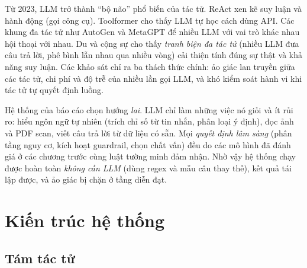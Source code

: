 Từ 2023, LLM trở thành ``bộ não'' phổ biến của tác tử. ReAct \cite{yao2023react} xen kẽ suy luận và hành động (gọi công cụ). Toolformer \cite{schick2023} cho thấy LLM tự học cách dùng API. Các khung đa tác tử như AutoGen \cite{wu2023autogen} và MetaGPT \cite{hong2024metagpt} để nhiều LLM với vai trò khác nhau hội thoại với nhau. Du và cộng sự \cite{du2024debate} cho thấy \emph{tranh biện đa tác tử} (nhiều LLM đưa câu trả lời, phê bình lẫn nhau qua nhiều vòng) cải thiện tính đúng sự thật và khả năng suy luận. Các khảo sát \cite{wang2024agents,guo2024mas} chỉ ra ba thách thức chính: ảo giác lan truyền giữa các tác tử, chi phí và độ trễ của nhiều lần gọi LLM, và khó kiểm soát hành vi khi tác tử tự quyết định luồng.

Hệ thống của báo cáo chọn hướng \emph{lai}. LLM chỉ làm những việc nó giỏi và ít rủi ro: hiểu ngôn ngữ tự nhiên (trích chỉ số từ tin nhắn, phân loại ý định), đọc ảnh và PDF scan, viết câu trả lời từ dữ liệu có sẵn. Mọi \emph{quyết định lâm sàng} (phân tầng nguy cơ, kích hoạt guardrail, chọn chất vấn) đều do các mô hình đã đánh giá ở các chương trước cùng luật tường minh đảm nhận. Nhờ vậy hệ thống chạy được hoàn toàn \emph{không cần LLM} (dùng regex và mẫu câu thay thế), kết quả tái lập được, và ảo giác bị chặn ở tầng diễn đạt.

\section{Kiến trúc hệ thống}

\subsection{Tám tác tử}


